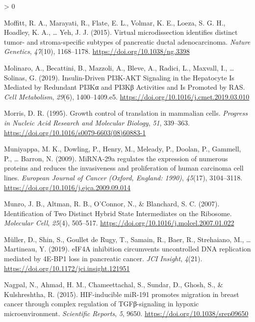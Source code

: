 \documentclass[
  12pt,
  openany]{book}
\newlength{\cslhangindent}
\newenvironment{CSLReferences}[2] %
 {%
  \setlength{\parindent}{0pt}
  \ifodd #1 \everypar{\setlength{\hangindent}{\cslhangindent}}\ignorespaces\fi
  \ifnum #2 > 0
  \setlength{\parskip}{#2\baselineskip}
  \fi
 }%
 {}
\begin{document}
\begin{CSLReferences}{1}{0}
\leavevmode\hypertarget{ref-Moffitt2015}{}%
Moffitt, R. A., Marayati, R., Flate, E. L., Volmar, K. E., Loeza, S. G. H., Hoadley, K. A., \ldots{} Yeh, J. J. (2015). Virtual microdissection identifies distinct tumor- and stroma-specific subtypes of pancreatic ductal adenocarcinoma. \emph{Nature Genetics}, \emph{47}(10), 1168--1178. \url{https://doi.org/10.1038/ng.3398}

\leavevmode\hypertarget{ref-Molinaro2019}{}%
Molinaro, A., Becattini, B., Mazzoli, A., Bleve, A., Radici, L., Maxvall, I., \ldots{} Solinas, G. (2019). Insulin-{Driven PI3K}-{AKT Signaling} in the {Hepatocyte Is Mediated} by {Redundant PI3Kα} and {PI3Kβ Activities} and {Is Promoted} by {RAS}. \emph{Cell Metabolism}, \emph{29}(6), 1400--1409.e5. \url{https://doi.org/10.1016/j.cmet.2019.03.010}

\leavevmode\hypertarget{ref-Morris1995}{}%
Morris, D. R. (1995). Growth control of translation in mammalian cells. \emph{Progress in Nucleic Acid Research and Molecular Biology}, \emph{51}, 339--363. \url{https://doi.org/10.1016/s0079-6603(08)60883-1}

\leavevmode\hypertarget{ref-Muniyappa2009}{}%
Muniyappa, M. K., Dowling, P., Henry, M., Meleady, P., Doolan, P., Gammell, P., \ldots{} Barron, N. (2009). {MiRNA}-29a regulates the expression of numerous proteins and reduces the invasiveness and proliferation of human carcinoma cell lines. \emph{European Journal of Cancer (Oxford, England: 1990)}, \emph{45}(17), 3104--3118. \url{https://doi.org/10.1016/j.ejca.2009.09.014}

\leavevmode\hypertarget{ref-Munro2007}{}%
Munro, J. B., Altman, R. B., O'Connor, N., \& Blanchard, S. C. (2007). Identification of {Two Distinct Hybrid State Intermediates} on the {Ribosome}. \emph{Molecular Cell}, \emph{25}(4), 505--517. \url{https://doi.org/10.1016/j.molcel.2007.01.022}

\leavevmode\hypertarget{ref-Muller2019}{}%
Müller, D., Shin, S., Goullet de Rugy, T., Samain, R., Baer, R., Strehaiano, M., \ldots{} Martineau, Y. (2019). {eIF4A} inhibition circumvents uncontrolled {DNA} replication mediated by {4E}-{BP1} loss in pancreatic cancer. \emph{JCI Insight}, \emph{4}(21). \url{https://doi.org/10.1172/jci.insight.121951}

\leavevmode\hypertarget{ref-Nagpal2015}{}%
Nagpal, N., Ahmad, H. M., Chameettachal, S., Sundar, D., Ghosh, S., \& Kulshreshtha, R. (2015). {HIF}-inducible {miR}-191 promotes migration in breast cancer through complex regulation of {TGFβ}-signaling in hypoxic microenvironment. \emph{Scientific Reports}, \emph{5}, 9650. \url{https://doi.org/10.1038/srep09650}


\end{CSLReferences}
\end{document}
